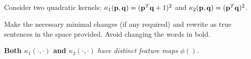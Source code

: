\begin{frame}
\section{}
Consider two quadratic kernels:  $\kappa_1({\bf p}, {\bf q}) = ({\bf p}^T{\bf q}+1)^2$ and $\kappa_2({\bf p}, {\bf q}) = ({\bf p}^T{\bf q})^2$.

Make the necessary minimal changes  (if any required) and rewrite as true sentences in the space provided. Avoid changing the words in bold.

{\bf Both $\kappa_1(\cdot, \cdot)$ and $\kappa_2(\cdot, \cdot)$} {\em have distinct feature maps $\phi()$.}
\end{frame}
